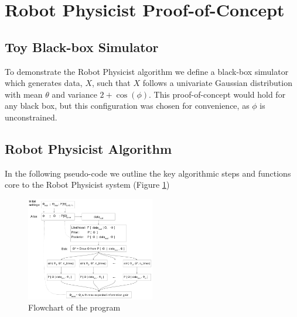 \documentclass[10pt,journal,compsoc]{IEEEtran}
\begin{document}



\section{Robot Physicist Proof-of-Concept}

\subsection{Toy Black-box Simulator}
To demonstrate the Robot Physicist algorithm we define a black-box simulator which generates data, $X$, such that $X$ follows a univariate Gaussian distribution with mean $\theta$ and variance $2 + \cos(\phi)$. This proof-of-concept would hold for any black box, but this configuration was chosen for convenience, as $\phi$ is unconstrained.

\subsection{Robot Physicist Algorithm}

In the following pseudo-code we outline the key algorithmic steps and functions core to the Robot Physicist system (Figure \ref{fig:flowchart})

\begin{figure}[ht!]
 \centering
  \includegraphics[width=0.5\textwidth]{images/flowchart.png}
  \caption{\label{fig:flowchart} Flowchart of the program}
\end{figure}
\end{document}
